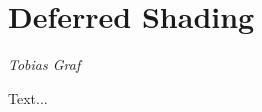 \section{Deferred Shading}

\begin{center}
\emph{{\small Tobias Graf}}
\end{center}

\bigskip

Text...